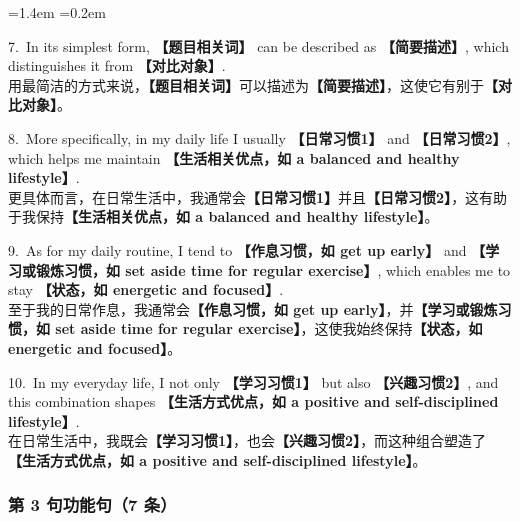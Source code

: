\documentclass[11pt,a4paper]{ctexart}
\newcommand{\fillin}[1]{{\bfseries【#1】}}
\newenvironment{eg}{%
  \par\addvspace{4pt}%
  \begin{list}{}{\leftmargin=1.4em \rightmargin=0.2em \listparindent=0pt
    \itemindent=0pt \topsep=0pt \parsep=2pt \itemsep=2pt \partopsep=0pt}%
  \item\relax
}{%
  \end{list}\addvspace{5pt}%
}
\begin{document}
\begin{eg}
7.\ In its simplest form, \fillin{题目相关词} can be described as \fillin{简要描述}, which distinguishes it from \fillin{对比对象}.\\
用最简洁的方式来说，\fillin{题目相关词}可以描述为\fillin{简要描述}，这使它有别于\fillin{对比对象}。

8.\ More specifically, in my daily life I usually \fillin{日常习惯1} and \fillin{日常习惯2}, which helps me maintain \fillin{生活相关优点，如 a balanced and healthy lifestyle}.\\
更具体而言，在日常生活中，我通常会\fillin{日常习惯1}并且\fillin{日常习惯2}，这有助于我保持\fillin{生活相关优点，如 a balanced and healthy lifestyle}。

9.\ As for my daily routine, I tend to \fillin{作息习惯，如 get up early} and \fillin{学习或锻炼习惯，如 set aside time for regular exercise}, which enables me to stay \fillin{状态，如 energetic and focused}.\\
至于我的日常作息，我通常会\fillin{作息习惯，如 get up early}，并\fillin{学习或锻炼习惯，如 set aside time for regular exercise}，这使我始终保持\fillin{状态，如 energetic and focused}。

10.\ In my everyday life, I not only \fillin{学习习惯1} but also \fillin{兴趣习惯2}, and this combination shapes \fillin{生活方式优点，如 a positive and self-disciplined lifestyle}.\\
在日常生活中，我既会\fillin{学习习惯1}，也会\fillin{兴趣习惯2}，而这种组合塑造了\fillin{生活方式优点，如 a positive and self-disciplined lifestyle}。
\end{eg}

\subsubsection{第 3 句功能句（7 条）}
\end{document}
